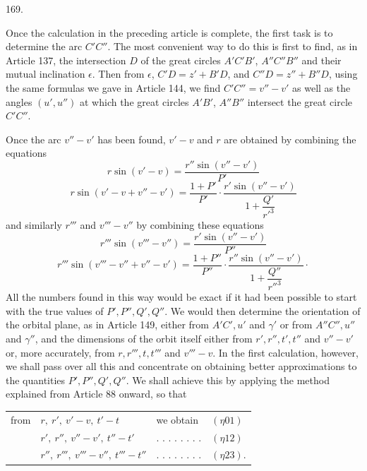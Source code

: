 \par{}\medskip
\begin{center}\hypertarget{native-234-article169}{}169.\end{center}
Once the calculation in the preceding article is complete, the first task is to determine the arc $C'C''$. The most convenient way to do this is first to find, as in Article 137, the intersection $D$ of the great circles $A'C'B'$, $A''C''B''$ and their mutual inclination $\epsilon$. Then from $\epsilon$, $C'D=z'+B'D$, and $C''D=z''+B''D$, using the same formulas we gave in Article 144, we find $C'C''=v''-v'$ as well as the angles $(u',u'')$ at which the great circles $A'B'$, $A''B''$ intersect the great circle $C'C''$.

Once the arc $v''-v'$ has been found, $v'-v$ and $r$ are obtained by combining the equations
\[
r\sin(v'-v)=\frac{r''\sin(v''-v')}{P'}
\]
\[
r\sin(v'-v+v''-v')=\frac{1+P'}{P'}\cdot\frac{r'\sin(v''-v')}{1+\dfrac{Q'}{r'^3}}
\]
and similarly $r'''$ and $v'''-v''$ by combining these equations
\[
r'''\sin(v'''-v'')=\frac{r'\sin(v''-v')}{P''}
\]
\[
r'''\sin(v'''-v''+v''-v')=\frac{1+P''}{P''}\cdot\frac{r''\sin(v''-v')}{1+\dfrac{Q''}{r''^3}}\mathpunct{\cdot}
\]
All the numbers found in this way would be exact if it had been possible to start with the true values of $P',P'',Q',Q''$. We would then determine the orientation of the orbital plane, as in Article 149, either from $A'C',u'$ and $\gamma'$ or from $A''C'',u''$ and $\gamma''$, and the dimensions of the orbit itself either from $r',r'',t',t''$ and $v''-v'$ or, more accurately, from $r,r''',t,t'''$ and $v'''-v$. In the first calculation, however, we shall pass over all this and concentrate on obtaining better approximations to the quantities $P',P'',Q',Q''$. We shall achieve this by applying the method explained from Article 88 onward, so that
\begin{center}
\begin{tabular}{@{}llll@{}}
from & $r,\ r',\ v'-v,\ t'-t$ & we obtain & $(\eta01)$\\
& $r',\ r'',\ v''-v',\ t''-t'$ & . . . . . . . . & $(\eta12)$\\
& $r'',\ r''',\ v'''-v'',\ t'''-t''$ & . . . . . . . . & $(\eta23)$.
\end{tabular}
\end{center}
